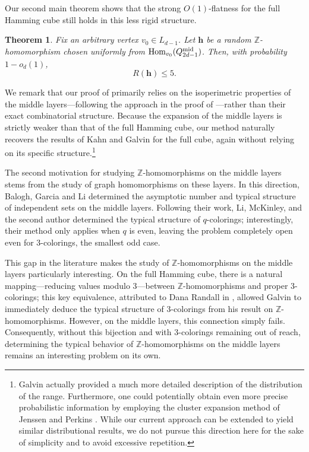 \documentclass{amsart}
\newtheorem{thm}{Theorem}[section]
\theoremstyle{definition}
\newcommand{\md}{\mathrm{mid}}
\newcommand{\0}[0]{\emptyset}
\newcommand{\Hom}[0]{\mbox{\rm{Hom}}}
\begin{document}
Our second main theorem shows that the strong $O(1)$-flatness for the full Hamming cube still holds in this less rigid structure.

\begin{thm}\label{thm:Z-hom-middle-layers}
Fix an arbitrary vertex $v_0\in L_{d-1}$. Let $\mathbf{h}$ be a random $\mathbb Z$-homomorphism chosen uniformly from $\Hom_{v_0}(Q_{2d-1}^{\md})$. Then, with probability $1-o_d(1)$,
\[
    R(\mathbf{h}) \le 5.
\]
\end{thm}

\noindent We remark that our proof of  primarily relies on the isoperimetric properties of the middle layers---following the approach in the proof of ---rather than their exact combinatorial structure. Because the expansion of the middle layers is strictly weaker than that of the full Hamming cube, our method naturally recovers the results of Kahn \cite{kahn2001range} and Galvin \cite{galvin2003homomorphisms} for the full cube, again without relying on its specific structure.\footnote{Galvin \cite{galvin2003homomorphisms} actually provided a much more detailed description of the distribution of the range. Furthermore, one could potentially obtain even more precise probabilistic information by employing the cluster expansion method of Jenssen and Perkins \cite{jenssen2020independent}. While our current approach can be extended to yield similar distributional results, we do not pursue this direction here for the sake of simplicity and to avoid excessive repetition.}

The second motivation for studying $\mathbb{Z}$-homomorphisms on the middle layers stems from the study of graph homomorphisms on these layers. In this direction, Balogh, Garcia and Li \cite{balogh2021independent} determined the asymptotic number and typical structure of independent sets on the middle layers. Following their work, Li, McKinley, and the second author \cite{li2023number} determined the typical structure of $q$-colorings; interestingly, their method only applies when $q$ is even, leaving the problem completely open even for $3$-colorings, the smallest odd case.

This gap in the literature makes the study of $\mathbb{Z}$-homomorphisms on the middle layers particularly interesting. On the full Hamming cube, there is a natural mapping---reducing values modulo $3$---between $\mathbb{Z}$-homomorphisms and proper $3$-colorings; this key equivalence, attributed to Dana Randall in \cite{galvin2003homomorphisms}, allowed Galvin to immediately deduce the typical structure of $3$-colorings from his result on $\mathbb Z$-homomorphisms. However, on the middle layers, this connection simply fails. Consequently, without this bijection and with $3$-colorings remaining out of reach, determining the typical behavior of $\mathbb{Z}$-homomorphisms on the middle layers remains an interesting problem on its own.
\end{document}
